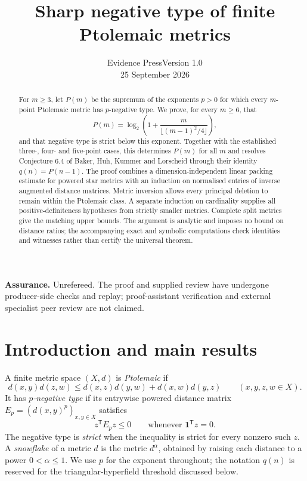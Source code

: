 \documentclass[11pt,a4paper]{article}
\title{\textbf{Sharp negative type of finite Ptolemaic metrics}}
\author{}
\date{Evidence Press\quad\textbar\quad Version 1.0\\[2pt]25 September 2026}
\theoremstyle{definition}
\theoremstyle{remark}
\numberwithin{equation}{section}
\newcommand{\one}{\mathbf 1}
\newcommand{\tr}{^{\mathsf T}}
\begin{document}
\maketitle
\vspace{-1.4em}
\begin{abstract}
For $m\ge3$, let $P(m)$ be the supremum of the exponents $p>0$ for which every $m$-point Ptolemaic metric has $p$-negative type. We prove, for every $m\ge6$, that
\[
P(m)=\log_2\!\left(1+\frac{m}{\lfloor(m-1)^2/4\rfloor}\right),
\]
and that negative type is strict below this exponent. Together with the established three-, four- and five-point cases, this determines $P(m)$ for all $m$ and resolves Conjecture 6.4 of Baker, Huh, Kummer and Lorscheid through their identity $q(n)=P(n-1)$. The proof combines a dimension-independent linear packing estimate for powered star metrics with an induction on normalised entries of inverse augmented distance matrices. Metric inversion allows every principal deletion to remain within the Ptolemaic class. A separate induction on cardinality supplies all positive-definiteness hypotheses from strictly smaller metrics. Complete split metrics give the matching upper bounds. The argument is analytic and imposes no bound on distance ratios; the accompanying exact and symbolic computations check identities and witnesses rather than certify the universal theorem.
\end{abstract}
\noindent\small\textbf{Assurance.} Unrefereed. The proof and supplied review have undergone producer-side checks and replay; proof-assistant verification and external specialist peer review are not claimed.\normalsize

\section{Introduction and main results}\label{sec:intro}
A finite metric space $(X,d)$ is \emph{Ptolemaic} if
\begin{equation}\label{eq:ptolemy}
 d(x,y)d(z,w)\le d(x,z)d(y,w)+d(x,w)d(y,z)
 \qquad(x,y,z,w\in X).
\end{equation}
It has \emph{$p$-negative type} if its entrywise powered distance matrix
$E_p=(d(x,y)^p)_{x,y\in X}$ satisfies
\begin{equation}\label{eq:negative-type}
 z\tr E_pz\le0\qquad\text{whenever }\one\tr z=0.
\end{equation}
The negative type is \emph{strict} when the inequality is strict for every nonzero such $z$. A \emph{snowflake} of a metric $d$ is the metric $d^\alpha$, obtained by raising each distance to a power $0<\alpha\le1$. We use $p$ for the exponent throughout; the notation $q(n)$ is reserved for the triangular-hyperfield threshold discussed below.
\end{document}
